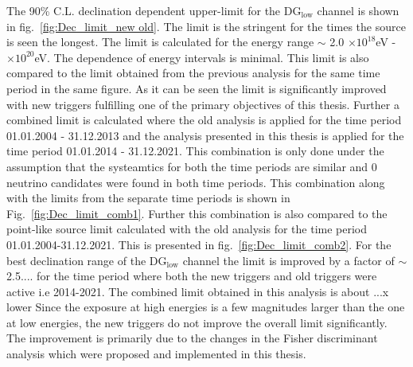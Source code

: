 The 90\% C.L. declination dependent upper-limit for the DG$_{\text{low}}$ channel is shown in fig.~\ref{fig:Dec_limit_new old}. The limit is the stringent for the times the source is seen the longest. The limit is calculated for the energy range $\sim$ 2.0 $\times 10^{18}$eV - $\times 10^{20}$eV. The dependence of energy intervals is minimal. This limit is also compared to the limit obtained from the previous analysis for the same time period in the same figure. As it can be seen the limit is significantly improved with new triggers fulfilling one of the primary objectives of this thesis. Further a combined limit is calculated where the old analysis is applied for the time period 01.01.2004 - 31.12.2013 and the analysis presented in this thesis is applied for the time period 01.01.2014 - 31.12.2021. This combination is only done under the assumption that the systeamtics for both the time periods are similar and 0 neutrino candidates were found in both time periods. This combination along with the limits from the separate time periods is shown in Fig.~\ref{fig:Dec_limit_comb1}. Further this combination is also compared to the point-like source limit calculated with the old analysis for the time period 01.01.2004-31.12.2021. This is presented in fig.~\ref{fig:Dec_limit_comb2}. For the best declination range of the DG$_{\text{low}}$ channel the limit is improved by a factor of $\sim$ 2.5.... for the time period where both the new triggers and old triggers were active i.e 2014-2021. The combined limit obtained in this analysis is about ...x lower Since the exposure at high energies is a few magnitudes larger than the one at low energies, the new triggers do not improve the overall limit significantly. The improvement is primarily due to the changes in the Fisher discriminant analysis which were proposed and implemented in this thesis.


